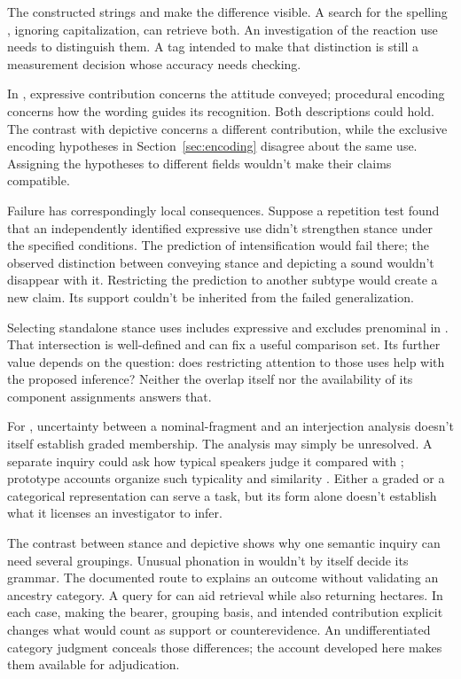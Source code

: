 The constructed strings  and  make the difference visible. A search for the spelling
, ignoring capitalization, can retrieve both. An investigation
of the reaction use needs to distinguish them. A tag intended to
make that distinction is still a measurement decision whose accuracy
needs checking.

In , expressive contribution concerns
the attitude conveyed; procedural encoding concerns how the wording
guides its recognition. Both descriptions could hold. The contrast with
depictive  concerns a different contribution, while the
exclusive encoding hypotheses in Section~\ref{sec:encoding} disagree about
the same use. Assigning the hypotheses to different fields wouldn't
make their claims compatible.

Failure has correspondingly local consequences. Suppose a repetition
test found that an independently identified expressive use didn't
strengthen stance under the specified conditions. The prediction of
intensification would fail there; the observed distinction between
conveying stance and depicting a sound wouldn't disappear with it.
Restricting the prediction to another subtype would create a new
claim. Its support couldn't be inherited from the failed generalization.

Selecting standalone stance uses includes expressive 
and excludes prenominal  in . That
intersection is well-defined and can fix a useful comparison set.
Its further value depends on the question: does restricting attention
to those uses help with the proposed inference? Neither the overlap
itself nor the availability of its component assignments answers that.

For , uncertainty between a nominal-fragment and an
interjection analysis doesn't itself establish graded membership. The
analysis may simply be unresolved. A separate inquiry could ask how
typical speakers judge it compared with ; prototype
accounts organize such typicality and similarity \citep{rosch1975,taylor2003}.
Either a graded or a categorical representation can serve a task,
but its form alone doesn't establish what it licenses an investigator
to infer.

The contrast between stance  and depictive 
shows why one semantic inquiry can need several groupings. Unusual
phonation in  wouldn't by itself decide its grammar.
The documented route to  explains an outcome without
validating an ancestry category. A query for  can aid
retrieval while also returning hectares.
In each case, making the bearer, grouping basis, and intended contribution
explicit changes what would count as support or counterevidence.
An undifferentiated category judgment conceals those differences; the
account developed here makes them available for adjudication.
